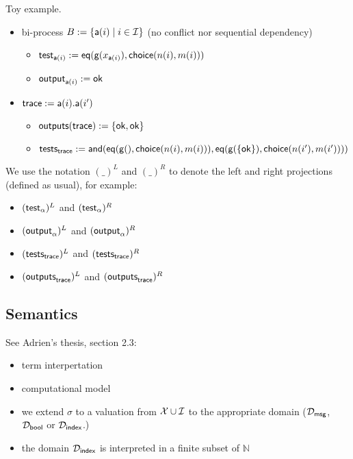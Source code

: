 \begin{example}
  Toy example.
  \begin{itemize}
    \item bi-process $B := \{ \textsf{a}(i) \mid i \in \mathcal{I} \}$ (no conflict nor sequential dependency)
      \begin{itemize}
        \item $\textsf{test}_{\textsf{a}(i)} := \mathsf{eq}(\mathsf{g}(x_{\textsf{a}(i)}), \mathsf{choice}(n(i),m(i)))$
        \item $\textsf{output}_{\textsf{a}(i)} := \mathsf{ok}$
      \end{itemize}
    \item $\textsf{trace} := \textsf{a}(i).\textsf{a}(i')$
    \begin{itemize}
      \item $\textsf{outputs}(\textsf{trace}) := \{\mathsf{ok},\mathsf{ok}\}$
      \item $\textsf{tests}_{\textsf{trace}} := \mathsf{and}(\mathsf{eq}(\mathsf{g}(), \mathsf{choice}(n(i),m(i))), \mathsf{eq}(\mathsf{g}(\{\mathsf{ok}\}), \mathsf{choice}(n(i'),m(i'))))$
    \end{itemize}
  \end{itemize}
\end{example}

\bigskip
\noindent
We use the notation $(\_)^L$ and $(\_)^R$ to denote the left and right projections (defined as usual), for example:
\begin{itemize}
  \item $(\textsf{test}_{\alpha})^L$ and $(\textsf{test}_{\alpha})^R$
  \item $(\textsf{output}_{\alpha})^L$ and $(\textsf{output}_{\alpha})^R$
  \item $(\textsf{tests}_{\textsf{trace}})^L$ and $(\textsf{tests}_{\textsf{trace}})^R$
  \item $(\textsf{outputs}_{\textsf{trace}})^L$ and $(\textsf{outputs}_{\textsf{trace}})^R$
\end{itemize}

\subsection{Semantics}

See Adrien's thesis, section 2.3:
\begin{itemize}
  \item term interpertation
  \item computational model
  \item we extend $\sigma$ to a valuation from $\mathcal{X} \cup \mathcal{I}$ to the appropriate domain ($\mathcal{D}_{\textsf{msg}}$, $\mathcal{D}_{\textsf{bool}}$ or $\mathcal{D}_{\textsf{index}}$.)
  \item the domain $\mathcal{D}_{\textsf{index}}$ is interpreted in a finite subset of $\mathbb{N}$
\end{itemize}
